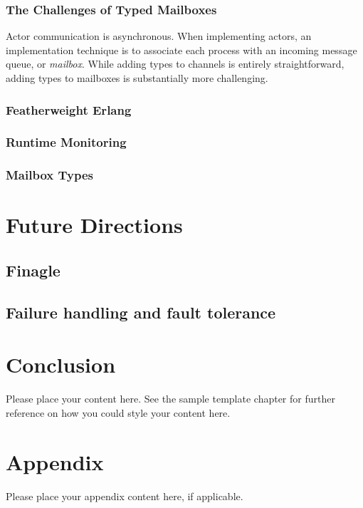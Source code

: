 \documentclass[
graybox,
envcountchap,
]{svmult}
\begin{document}
\begin{bibunit}
  \subsubsection{The Challenges of Typed Mailboxes}
  Actor communication is asynchronous. When implementing actors, an
  implementation technique is to associate each process with an incoming message
  queue, or \emph{mailbox}. While adding types to channels is entirely
  straightforward, adding types to mailboxes is substantially more challenging.


  \subsubsection{Featherweight Erlang}
  \subsubsection{Runtime Monitoring}
  \subsubsection{Mailbox Types}

  \section{Future Directions}
  \subsection{Finagle}
  \subsection{Failure handling and fault tolerance}

  \section{Conclusion}

	Please place your content here. See the sample template chapter for further reference on how you could style your content here.


	\section*{Appendix}\label{appendix}

	Please place your appendix content here, if applicable.



\end{bibunit}
\end{document}
